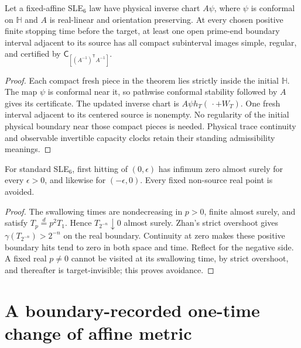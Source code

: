 \begin{corollary}
\label{cor:physical-stopping-frontier-certified}
Let a fixed-affine SLE$_6$ law have physical inverse chart $A\psi$,
where $\psi$ is conformal on $\mathbb H$ and $A$ is real-linear
and orientation preserving. At every chosen positive finite stopping
time before the target, at least one open prime-end boundary interval
adjacent to its source has all compact subinterval images simple,
regular, and certified by
$\mathsf C_{[(A^{-1})^{\mathsf T}A^{-1}]}$.
\end{corollary}
\begin{proof}
Each compact fresh piece in the theorem lies strictly inside the
initial $\mathbb H$. The map $\psi$ is conformal near it, so
pathwise conformal stability followed by $A$ gives its certificate.
The updated inverse chart is
$A\psi h_T(\,\cdot+W_T)$. One fresh interval adjacent to its
centered source is nonempty. No regularity of the initial physical
boundary near those compact pieces is needed. Physical trace
continuity and observable invertible capacity clocks retain their
standing admissibility meanings.
\end{proof}

\begin{lemma}
\label{lem:sle-six-immediate-side-hits}
For standard SLE$_6$, first hitting of $(0,\epsilon)$ has infimum
zero almost surely for every $\epsilon>0$, and likewise for
$(-\epsilon,0)$. Every fixed non-source real point is avoided.
\end{lemma}
\begin{proof}
The swallowing times are nondecreasing in $p>0$, finite almost
surely, and satisfy $T_p\stackrel d=p^2T_1$. Hence
$T_{2^{-n}}\downarrow0$ almost surely. Zhan's strict overshoot gives
$\gamma(T_{2^{-n}})>2^{-n}$ on the real boundary. Continuity at
zero makes these positive boundary hits tend to zero in both space
and time. Reflect for the negative side. A fixed real $p\ne0$
cannot be visited at its swallowing time, by strict overshoot, and
thereafter is target-invisible; this proves avoidance.
\end{proof}

\section{A boundary-recorded one-time change of affine metric}
\label{sec:one-switch-construction}

